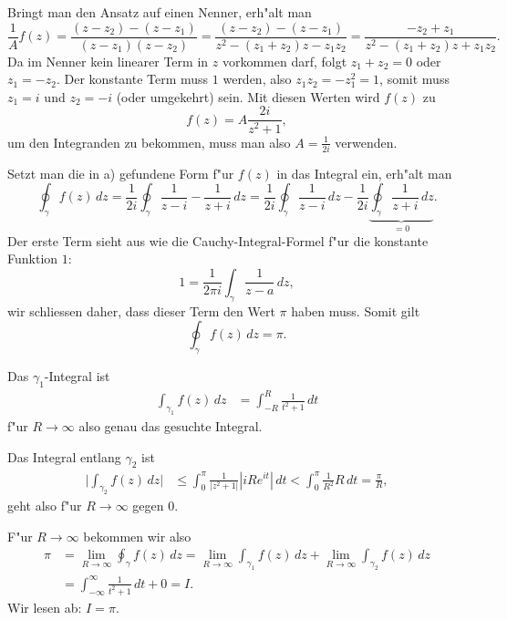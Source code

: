 \begin{loesung}
\begin{teilaufgaben}
\item
Bringt man den Ansatz auf einen Nenner, erh"alt man
\[
\frac1Af(z)
=
\frac{(z-z_2)-(z-z_1)}{(z-z_1)(z-z_2)}
=
\frac{(z-z_2)-(z-z_1)}{z^2-(z_1+z_2)z-z_1z_2}
=
\frac{-z_2+z_1}{z^2-(z_1+z_2)z+z_1z_2}.
\]
Da im Nenner kein linearer Term in $z$ vorkommen darf, folgt
$z_1+z_2=0$ oder $z_1=-z_2$.
Der konstante Term muss $1$ werden, also $z_1z_2=-z_1^2=1$,
somit muss $z_1=i$ und $z_2=-i$ (oder umgekehrt) sein.
Mit diesen Werten wird $f(z)$ zu
\[
f(z)=A\frac{2i}{z^2+1},
\]
um den Integranden zu bekommen, muss man also $A=\frac1{2i}$ verwenden.
\item
Setzt man die in a) gefundene Form f"ur $f(z)$ in das Integral ein, erh"alt
man
\[
\oint_\gamma f(z)\,dz
=
\frac1{2i}
\oint_\gamma
\frac{1}{z-i}-\frac{1}{z+i}\,dz
=
\frac1{2i} \oint_\gamma \frac{1}{z-i}\,dz
-
\frac1{2i}
\underbrace{\oint_\gamma \frac{1}{z+i}\,dz}_{\textstyle=0}.
\]
Der erste Term sieht aus wie die Cauchy-Integral-Formel f"ur die konstante
Funktion $1$:
\[
1=\frac1{2\pi i}\int_\gamma \frac{1}{z-a}\,dz,
\]
wir schliessen daher, dass dieser Term den Wert $\pi$ haben muss.
Somit gilt
\[
\oint_\gamma f(z)\,dz
=
\pi.
\]
\item
Das $\gamma_1$-Integral ist
\begin{align*}
\int_{\gamma_1} f(z)\,dz &= \int_{-R}^{R} \frac1{t^2+1}\,dt
\end{align*}
f"ur $R\to\infty$ also genau das gesuchte Integral.
\item
Das Integral entlang $\gamma_2$ ist
\begin{align*}
\biggl|\int_{\gamma_2} f(z)\,dz\biggr|
&
\le
\int_0^\pi \frac1{|z^2+1|} |iRe^{it}|\,dt
<
\int_0^\pi \frac1{R^2} R\,dt
=\frac{\pi}{R},
\end{align*}
geht also f"ur $R\to\infty$ gegen 0.
\item
F"ur $R\to\infty$ bekommen wir also
\begin{align*}
\pi
&=
\lim_{R\to\infty}\oint_{\gamma} f(z)\,dz
=
\lim_{R\to\infty}\int_{\gamma_1} f(z)\,dz
+
\lim_{R\to\infty}\int_{\gamma_2} f(z)\,dz
\\
&=
\int_{-\infty}^{\infty} \frac1{t^2+1}\,dt + 0 = I.
\end{align*}
Wir lesen ab: $I=\pi$.
\qedhere
\end{teilaufgaben}
\end{loesung}


